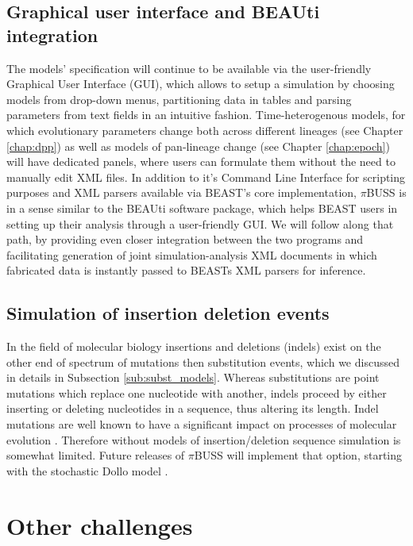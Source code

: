 \subsection{Graphical user interface and BEAUti integration}

The models' specification will continue to be available via the user-friendly Graphical User Interface (GUI), which allows to setup a simulation by choosing models from drop-down menus, partitioning data in tables and parsing parameters from text fields in an intuitive fashion.
Time-heterogenous models, for which evolutionary parameters change both across different lineages (see Chapter \ref{chap:dpp}) as well as models of pan-lineage change (see Chapter \ref{chap:epoch}) will have dedicated panels, where users can formulate them without the need to manually edit XML files.
In addition to it's Command Line Interface for scripting purposes and XML parsers available via BEAST's core implementation, $\pi$BUSS is in a sense similar to the BEAUti software package, which helps BEAST users in setting up their analysis through a user-friendly GUI.
We will follow along that path, by providing even closer integration between the two programs and facilitating generation of joint simulation-analysis XML documents in which fabricated data is instantly passed to BEASTs XML parsers for inference.

\subsection{Simulation of insertion deletion events}

In the field of molecular biology insertions and deletions (indels) exist on the other end of spectrum of mutations then substitution events, which we discussed in details in Subsection \ref{sub:subst_models}.
Whereas substitutions are point mutations which replace one nucleotide with another, indels proceed by either inserting or deleting nucleotides in a sequence, thus altering its length. 
Indel mutations are well known to have a significant impact on processes of molecular evolution \citep{Fletcher2009}.
Therefore without models of insertion/deletion sequence simulation is somewhat limited.
Future releases of $\pi$BUSS will implement that option, starting with the stochastic Dollo model \citep{LeQuesne1974}.

\section{Other challenges}

